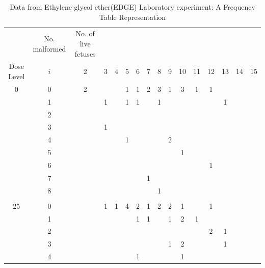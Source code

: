\documentclass[12pt,oneside]{report}
\theoremstyle{definition}
\theoremstyle{mystyle}
\begin{document}
\newpage
\begin{center}
	\tiny
	
	\begin{longtable}[h!]{c c c c c c c c c c c c c c c c}
		\caption{Data from Ethylene glycol ether(EDGE) Laboratory experiment: A Frequency Table Representation}\\
		\hline		
		\multicolumn{1}{r}{}
		&  \multicolumn{1}{c}{No. malformed}
		& \multicolumn{1}{c}{No. of live fetuses} \\
		
		\cline{3-15}
		Dose	Level    & $i$ & 2&3&4&5&6&7&8&9&10&11&12&13&14&15 \\
		\hline
		0& 0&2 &&&1&1&2&3&1&3&1&1&& &     \\
		& 1        & &1&&1&1&&1&&&&&1& &      \\
		& 2    &&&&&&&&&&&&&&      \\
		&3     &  &1&&&&&&&&&&& &    \\
		& 4     &  &&&1&&&&2&&&&&&\\
		& 5     &  &&&&&&&&1&&&& &     \\
		& 6     &  &&&&&&&&&&1&&      \\
		& 7     &  &&&&&1&&&&&&&      \\
		& 8     &  &&&&&&1&&&&&&      \\
		&      &  &&&&&&&&&&&&   &   \\
		25& 0     &  &1&1&4&2&1&2&2&1&&1&& &     \\
		& 1     &  &&&&1&1&&1&2&1&&&  &    \\
		& 2     &  &&&&&&&&&&2&1&   &   \\
		& 3     &  &&&&&&&1&2&&&1&  &    \\
		& 4     &  &&&&1&&&&1&&&&   &   \\

\end{longtable}
\end{center}
\end{document}
